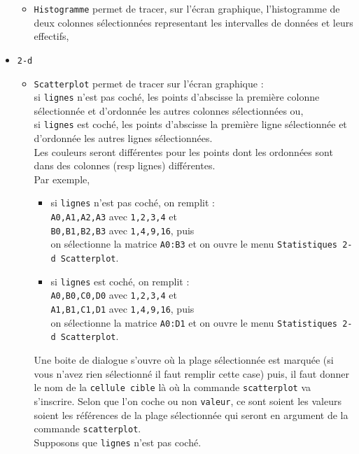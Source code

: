 \documentclass[a4paper,11pt]{article}
\begin{document}
\begin{itemize}
\begin{itemize}
\item {\tt Histogramme} permet de tracer, sur l'\'ecran graphique, 
l'histogramme de  deux colonnes s\'electionn\'ees representant les intervalles 
de donn\'ees et leurs effectifs,
\end{itemize}
\item {\tt 2-d}
\begin{itemize}
\item {\tt Scatterplot}  permet de tracer sur l'\'ecran graphique :\\
si {\tt lignes} n'est pas coch\'e, les points 
d'abscisse la premi\`ere colonne s\'electionn\'ee et d'ordonn\'ee les autres 
colonnes s\'electionn\'ees ou,\\
si {\tt lignes} est coch\'e, les points d'abscisse la premi\`ere ligne 
s\'electionn\'ee et d'ordonn\'ee les autres lignes s\'electionn\'ees.\\
 Les couleurs seront diff\'erentes pour les points
dont les ordonn\'ees sont dans des colonnes (resp lignes) diff\'erentes.\\
Par exemple,
\begin{itemize}
\item  si {\tt lignes} n'est pas coch\'e, on remplit :\\
{\tt A0,A1,A2,A3} avec {\tt 1,2,3,4} et \\
{\tt B0,B1,B2,B3} avec {\tt 1,4,9,16}, puis \\
on s\'electionne la matrice {\tt A0:B3} et on ouvre le menu 
{\tt Statistiques 2-d  Scatterplot}.
\item  si {\tt lignes} est coch\'e, on remplit :\\
{\tt A0,B0,C0,D0} avec {\tt 1,2,3,4} et \\
{\tt A1,B1,C1,D1} avec {\tt 1,4,9,16}, puis \\
on s\'electionne la matrice {\tt A0:D1} et on ouvre le menu 
{\tt Statistiques 2-d  Scatterplot}.
\end{itemize}
Une boite de dialogue s'ouvre o\`u la plage s\'electionn\'ee est marqu\'ee 
(si vous n'avez rien s\'electionn\'e il faut remplir cette case) puis,
il faut donner le nom de la {\tt cellule cible} l\`a o\`u la commande 
{\tt scatterplot} va s'inscrire. Selon que l'on coche ou non {\tt valeur}, ce 
sont soient les valeurs soient les r\'ef\'erences de la plage 
s\'electionn\'ee qui seront en argument de la commande {\tt scatterplot}. \\
Supposons que {\tt lignes} n'est pas coch\'e.
\begin{itemize}

\end{itemize}
\end{itemize}
\end{itemize}
\end{document}
